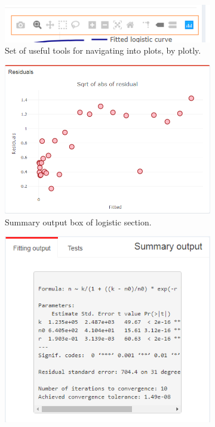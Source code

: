 \documentclass[
12pt, %
a4paper, %
oneside, %
headinclude,footinclude, %
BCOR5mm, %
]{scrartcl}
\begin{document}
\begin{figure}[H]
  \centering
\begin{subfigure}{0.6\textwidth}
  \includegraphics[width=1\linewidth]{Figures/logistic_plot3.png} 
  \caption{Set of useful tools for navigating into plots, by plotly.}
  \label{fig:logistic_plot3}
\end{subfigure} 
\hspace{5.5cm}
\begin{subfigure}{0.6\textwidth}
  \includegraphics[width=1\linewidth]{Figures/logistic_res1.png} 
  \caption{Summary output box of logistic section.}
  \label{fig:logistic_res1}
\end{subfigure} 
\hspace{5.5cm}
\begin{subfigure}{0.6\textwidth}
  \includegraphics[width=1\linewidth]{Figures/logistic_smry1.png} 

\end{subfigure}
\end{figure}
\end{document}
